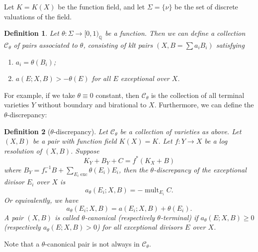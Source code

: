 \documentclass[11pt]{amsart}
\newtheorem{defn}{Definition}[section]
\begin{document}
Let $ K=K(X) $ be the function field, and let $ \Sigma=\{\nu\} $ be the set of discrete valuations of the field. 
\begin{defn}\label{thetacategory}
  \cite[Definition 3.5]{brunoLogSarkisovProgram1995}
  Let  $\theta:\Sigma\to [0,1)_\mathbb{Q}$ be a function. Then we can define a collection $ \mathcal{C}_\theta $ of pairs  associated to $ \theta $, consisting of klt pairs $ (X,B=\sum a_iB_i) $ satisfying
  \begin{enumerate}
    \item $ a_i=\theta(B_i) $;
    \item $ a(E;X,B)>-\theta(E) $ for all $ E $ exceptional over $ X $.
  \end{enumerate} 
\end{defn}
For example, if we take $\theta \equiv 0$ constant, then $\mathcal{C}_{\theta}$ is the collection of all terminal varieties $Y$ without boundary and birational to $X$. Furthermore, we can define the $\theta$-discrepancy:
\begin{defn}[$\theta$-discrepancy]
  Let $\mathcal{C}_{\theta}$ be a collection of varieties as above. Let $(X,B)$ be a pair with function field $K(X)=K$. Let  $f:Y\to X$ be a log resolution of $(X,B)$. Suppose
  \[
  K_{Y}+B_{Y}+C=f^*(K_{X}+B)
  \]
  where $B_{Y}=f^{-1}_*B+ \sum_{E_{i}\text{ exc}} \theta(E_{i})E_{i}$, then the $\theta$-discrepancy  of the exceptional divisor $E_{i}$ over $X$ is 
  \[
    a_{\theta}(E_{i};X,B)=-\operatorname{mult}_{E_{i}}C.
  \]
 Or equivalently, we have 
 \[
    a_{\theta}(E_{i};X,B)=a(E_{i};X,B)+\theta(E_{i}).
 \]
A pair $(X,B)$ is called $\theta$-canonical (respectively $\theta$-terminal) if $a_{\theta}(E;X,B)\geqslant 0$ (respectively $a_{\theta}(E;X,B)> 0$) for all exceptional  divisors $E$ over $X$.  
\end{defn}
Note that a $\theta$-canonical pair is not always in $\mathcal{C}_{\theta}$.
\end{document}

